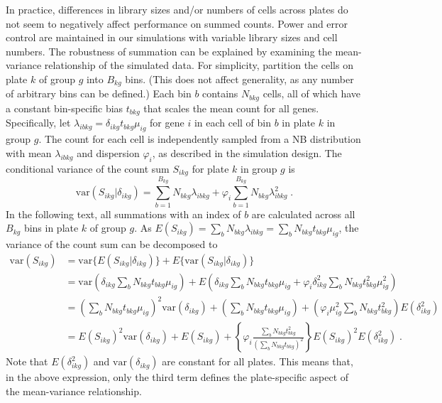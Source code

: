 \documentclass{article}
\newcommand\revised[1]{#1} %
\begin{document}
In practice, differences in library sizes and/or numbers of cells across plates do not seem to negatively affect performance on summed counts.
Power and error control are maintained in our simulations with variable library sizes and cell numbers.
The robustness of summation can be explained by examining the mean-variance relationship of the simulated data.
For simplicity, partition the cells on plate $k$ of group $g$ into $B_{kg}$ bins.
(This does not affect generality, as any number of arbitrary bins can be defined.)
Each bin $b$ contains $N_{bkg}$ cells, all of which have a constant bin-specific bias $t_{bkg}$ that scales the mean count for all genes.
Specifically, let $\lambda_{ibkg} = \delta_{ikg}t_{bkg}\mu_{ig}$ for gene $i$ in each cell of bin $b$ in plate $k$ in group $g$.
The count for each cell is independently sampled from a NB distribution with mean $\lambda_{ibkg}$ and dispersion $\varphi_i$, as described in the simulation design.
The conditional variance of the count sum $S_{ikg}$ for plate $k$ in group $g$ is 
\[
    \mbox{var}(S_{ikg} | \delta_{ikg}) = \sum_{b=1}^{B_{kg}} N_{bkg} \lambda_{ibkg}  + \varphi_{i} \sum_{b=1}^{B_{kg}} N_{bkg} \lambda_{ibkg}^2 \;.
\]
In the following text, all summations with an index of $b$ are calculated across all $B_{kg}$ bins in plate $k$ of group $g$.
As $E(S_{ikg}) = \sum_{b} N_{bkg}\lambda_{ibkg} = \sum_{b} N_{bkg} t_{bkg} \mu_{ig}$, the variance of the count sum can be decomposed to
\begin{align*}
    \mbox{var}(S_{ikg}) 
    &= \mbox{var}\{E(S_{ikg} | \delta_{ikg} ) \} + E\{ \mbox{var}(S_{ikg} | \delta_{ikg}) \}\\
    &= \mbox{var}\left(\delta_{ikg}\sum_{b} N_{bkg} t_{bkg}\mu_{ig}\right) + E\left(\delta_{ikg}\sum_{b}  N_{bkg}t_{bkg}\mu_{ig}  + \varphi_{i} \delta_{ikg}^2 \sum_{b}  N_{bkg}t_{bkg}^2\mu_{ig}^2\right)\\
    &= \left(\sum_{b} N_{bkg} t_{bkg}\mu_{ig} \right)^2 \mbox{var}(\delta_{ikg}) + \left(\sum_{b} N_{bkg} t_{bkg}\mu_{ig}\right) + \left( \varphi_i\mu_{ig}^2 \sum_{b}  N_{bkg}t_{bkg}^2 \right) E(\delta_{ikg}^2) \\
    &= E(S_{ikg})^2 \mbox{var}(\delta_{ikg}) + E(S_{ikg}) + \left\{ \varphi_i \frac{\sum_{b} N_{bkg} t_{bkg}^2}{ (\sum_{b} N_{bkg} t_{bkg})^2}  \right\} E(S_{ikg})^2 E(\delta_{ikg}^2) \;. 
\end{align*}
\revised{Note} that $E(\delta_{ikg}^2)$ and $\mbox{var}(\delta_{ikg})$ are constant for all plates.
This means that\revised{, in the above expression,} only the third term defines the plate-specific aspect of the mean-variance relationship.
\end{document}
